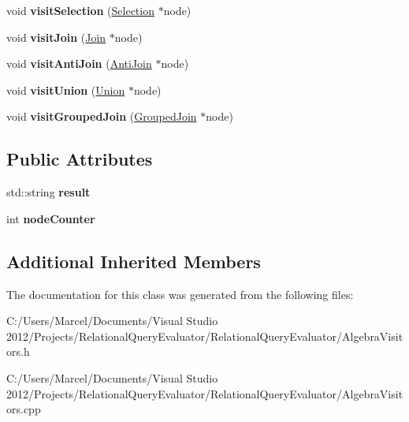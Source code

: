 \begin{DoxyCompactItemize}
\item 
\hypertarget{class_graph_drawing_visitor_a8c533a1dc5b55e26608615ff392e384b}{void {\bfseries visit\+Selection} (\hyperlink{class_selection}{Selection} $\ast$node)}\label{class_graph_drawing_visitor_a8c533a1dc5b55e26608615ff392e384b}

\item 
\hypertarget{class_graph_drawing_visitor_a77fbec744cd6a2ac39e22120114c7edd}{void {\bfseries visit\+Join} (\hyperlink{class_join}{Join} $\ast$node)}\label{class_graph_drawing_visitor_a77fbec744cd6a2ac39e22120114c7edd}

\item 
\hypertarget{class_graph_drawing_visitor_ae25e72a771d8ec5949caa0a92a1e61aa}{void {\bfseries visit\+Anti\+Join} (\hyperlink{class_anti_join}{Anti\+Join} $\ast$node)}\label{class_graph_drawing_visitor_ae25e72a771d8ec5949caa0a92a1e61aa}

\item 
\hypertarget{class_graph_drawing_visitor_af0a1bb8a0ba7f47a89a8ae01288af625}{void {\bfseries visit\+Union} (\hyperlink{class_union}{Union} $\ast$node)}\label{class_graph_drawing_visitor_af0a1bb8a0ba7f47a89a8ae01288af625}

\item 
\hypertarget{class_graph_drawing_visitor_a4d92f0106ac1d8035498c8b5e1490919}{void {\bfseries visit\+Grouped\+Join} (\hyperlink{class_grouped_join}{Grouped\+Join} $\ast$node)}\label{class_graph_drawing_visitor_a4d92f0106ac1d8035498c8b5e1490919}

\end{DoxyCompactItemize}
\subsection*{Public Attributes}
\begin{DoxyCompactItemize}
\item 
\hypertarget{class_graph_drawing_visitor_a99563612519b31409a263df7b3ae2372}{std\+::string {\bfseries result}}\label{class_graph_drawing_visitor_a99563612519b31409a263df7b3ae2372}

\item 
\hypertarget{class_graph_drawing_visitor_a0761312fb1e24b1951c0b263b19f268c}{int {\bfseries node\+Counter}}\label{class_graph_drawing_visitor_a0761312fb1e24b1951c0b263b19f268c}

\end{DoxyCompactItemize}
\subsection*{Additional Inherited Members}


The documentation for this class was generated from the following files\+:\begin{DoxyCompactItemize}
\item 
C\+:/\+Users/\+Marcel/\+Documents/\+Visual Studio 2012/\+Projects/\+Relational\+Query\+Evaluator/\+Relational\+Query\+Evaluator/Algebra\+Visitors.\+h\item 
C\+:/\+Users/\+Marcel/\+Documents/\+Visual Studio 2012/\+Projects/\+Relational\+Query\+Evaluator/\+Relational\+Query\+Evaluator/Algebra\+Visitors.\+cpp\end{DoxyCompactItemize}
